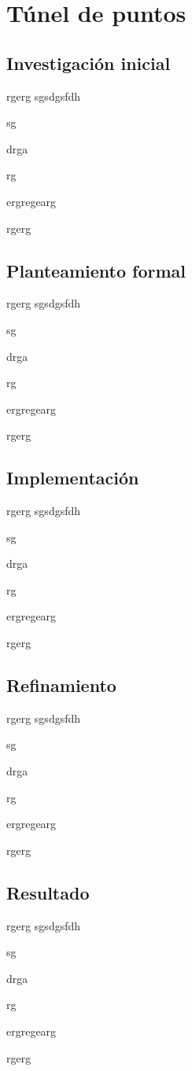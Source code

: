 \section{Túnel de puntos}

\subsection{Investigación inicial}

rgerg
sgsdgsfdh

sg

drga

rg

ergregearg

rgerg

\subsection{Planteamiento formal}

rgerg
sgsdgsfdh

sg

drga

rg

ergregearg

rgerg

\subsection{Implementación}

rgerg
sgsdgsfdh

sg

drga

rg

ergregearg

rgerg

\subsection{Refinamiento}

rgerg
sgsdgsfdh

sg

drga

rg

ergregearg

rgerg

\subsection{Resultado}

rgerg
sgsdgsfdh

sg

drga

rg

ergregearg

rgerg
